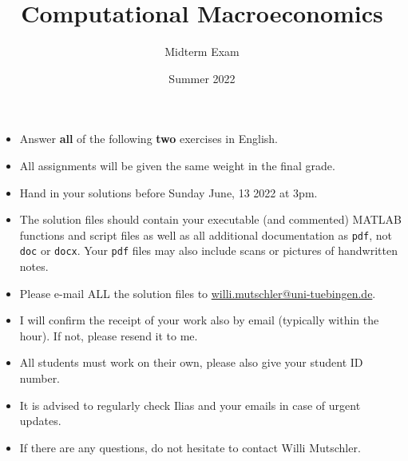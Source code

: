 \documentclass{article}
\begin{document}
	
\title{Computational Macroeconomics}
\author{Midterm Exam}
\date{Summer 2022}
\maketitle

\begin{itemize}
\item
Answer \textbf{all} of the following \textbf{two} exercises in English.

\item
All assignments will be given the same weight in the final grade.

\item
Hand in your solutions before Sunday June, 13 2022 at 3pm.

\item
The solution files should contain your executable (and commented) MATLAB functions and script files
  as well as all additional documentation as \texttt{pdf}, not \texttt{doc} or \texttt{docx}.
Your \texttt{pdf} files may also include scans or pictures of handwritten notes.

\item
Please e-mail ALL the solution files to \url{willi.mutschler@uni-tuebingen.de}.

\item
I will confirm the receipt of your work also by email (typically within the hour). If not, please resend it to me.		

\item
All students must work on their own, please also give your student ID number.		

\item
It is advised to regularly check Ilias and your emails in case of urgent updates.

\item
If there are any questions, do not hesitate to contact Willi Mutschler.
\end{itemize}

\newpage
\end{document}
